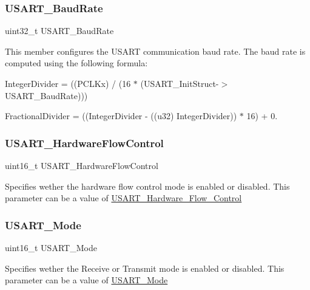 \subsubsection{\texorpdfstring{USART\_BaudRate}{USART\_BaudRate}}
{\footnotesize\ttfamily uint32\+\_\+t U\+S\+A\+R\+T\+\_\+\+Baud\+Rate}

This member configures the U\+S\+A\+RT communication baud rate. The baud rate is computed using the following formula\+:
\begin{DoxyItemize}
\item Integer\+Divider = ((P\+C\+L\+Kx) / (16 $\ast$ (U\+S\+A\+R\+T\+\_\+\+Init\+Struct-\/$>$U\+S\+A\+R\+T\+\_\+\+Baud\+Rate)))
\item Fractional\+Divider = ((Integer\+Divider -\/ ((u32) Integer\+Divider)) $\ast$ 16) + 0. 
\end{DoxyItemize}\mbox{\label{struct_u_s_a_r_t___init_type_def_ab41fe3b9f5cb4ed89be23bff0a1f4114}} 
\subsubsection{\texorpdfstring{USART\_HardwareFlowControl}{USART\_HardwareFlowControl}}
{\footnotesize\ttfamily uint16\+\_\+t U\+S\+A\+R\+T\+\_\+\+Hardware\+Flow\+Control}

Specifies wether the hardware flow control mode is enabled or disabled. This parameter can be a value of \mbox{\hyperlink{group___u_s_a_r_t___hardware___flow___control}{U\+S\+A\+R\+T\+\_\+\+Hardware\+\_\+\+Flow\+\_\+\+Control}} \mbox{\label{struct_u_s_a_r_t___init_type_def_a1a581f24451bf5a4a210bab8d68998e2}} 
\subsubsection{\texorpdfstring{USART\_Mode}{USART\_Mode}}
{\footnotesize\ttfamily uint16\+\_\+t U\+S\+A\+R\+T\+\_\+\+Mode}

Specifies wether the Receive or Transmit mode is enabled or disabled. This parameter can be a value of \mbox{\hyperlink{group___u_s_a_r_t___mode}{U\+S\+A\+R\+T\+\_\+\+Mode}} \mbox{\label{struct_u_s_a_r_t___init_type_def_a4edcc84644c8553a1a6e841c48ea8413}} 
